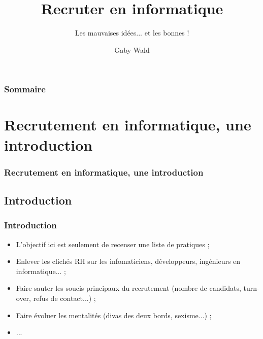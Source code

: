 \documentclass[slidetop,11pt]{beamer}
\title{Recruter en informatique}
\subtitle{Les mauvaises id{\'e}es... et les bonnes !}
\author{Gaby Wald}
\institute{\emph{to be defined}}
\begin{document}
\frame[plain]{\titlepage } 
%


\begin{frame}
	\frametitle{Sommaire}
	\small \tableofcontents[hideallsubsections]
\end{frame} 

\section{Recrutement en informatique, une introduction}
\begin{frame}
	\frametitle{Recrutement en informatique, une introduction}
	\tableofcontents[sections=1,currentsection,subsectionstyle=show/shaded/hide] %
\end{frame}

\subsection{Introduction}
\begin{frame}
	\frametitle{Introduction}
	\begin{itemize}
		\item L'objectif ici est seulement de recenser une liste de pratiques ; 
		\item Enlever les clich{\'e}s RH sur les infomaticiens, d{\'e}veloppeurs, ing{\'e}nieurs en informatique... ; 
		\item Faire sauter les soucis principaux du recrutement (nombre de candidats, turn-over, refus de contact...) ;
		\item Faire {\'e}voluer les mentalit{\'e}s (divas des deux bords, sexisme...) ; 
		\item ...  
	\end{itemize}
\end{frame}
\end{document}
